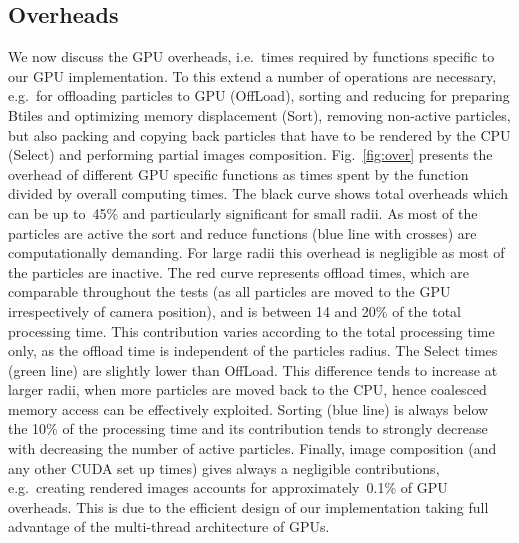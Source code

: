 \documentclass[preprint,5pt]{elsarticle}
\begin{document}
\subsection{Overheads}
\label{sec:overhead}
We now discuss the GPU overheads, i.e.\ times required by functions specific to our GPU implementation. To this extend a number of operations are necessary, e.g.\ for offloading particles to GPU (OffLoad), sorting and reducing for preparing Btiles and optimizing memory displacement (Sort), removing non-active particles, but also packing and copying back particles that have to be rendered by the CPU (Select) and performing partial images composition. Fig.~\ref{fig:over} presents the overhead of different GPU specific functions as times spent by the function divided by overall computing times. The black curve shows total overheads which can be up to~45\% and particularly significant for small radii. As most of the particles are active the sort and reduce
functions (blue line with crosses) are computationally demanding. For large radii this overhead is negligible as most of the particles are inactive. 
The red curve represents offload times, which are comparable throughout the tests (as all particles are moved to the GPU irrespectively of camera position), and is between 14 and 20\% of the total processing time. This contribution varies according to the total processing time only, as the offload time is independent of the particles radius.
The Select times (green line) are slightly lower than OffLoad. This difference tends to increase at larger radii,  when more particles are moved back to the CPU, hence coalesced memory access can be effectively exploited. 
Sorting (blue line) is always below the 10\% of the processing time and its contribution tends to strongly decrease with decreasing the 
number of active particles.
Finally, image composition (and any other CUDA set up times) gives always a negligible contributions, e.g.\ creating rendered images accounts for approximately~0.1\% of GPU overheads. This is due to the efficient design of our implementation taking full advantage of the multi-thread architecture of GPUs.
\end{document}
